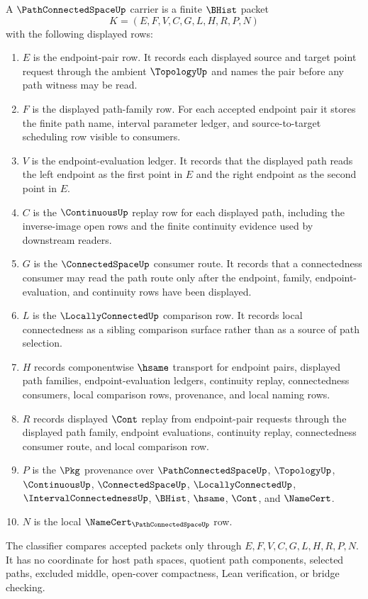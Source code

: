 \begin{definition}
\label{def:path-connected-space-carrier}
A $\PathConnectedSpaceUp$ carrier is a finite $\BHist$ packet
$$
K=(E,F,V,C,G,L,H,R,P,N)
$$
with the following displayed rows:
\begin{enumerate}
\item $E$ is the endpoint-pair row. It records each displayed source and target point request through the ambient $\TopologyUp$ and names the pair before any path witness may be read.
\item $F$ is the displayed path-family row. For each accepted endpoint pair it stores the finite path name, interval parameter ledger, and source-to-target scheduling row visible to consumers.
\item $V$ is the endpoint-evaluation ledger. It records that the displayed path reads the left endpoint as the first point in $E$ and the right endpoint as the second point in $E$.
\item $C$ is the $\ContinuousUp$ replay row for each displayed path, including the inverse-image open rows and the finite continuity evidence used by downstream readers.
\item $G$ is the $\ConnectedSpaceUp$ consumer route. It records that a connectedness consumer may read the path route only after the endpoint, family, endpoint-evaluation, and continuity rows have been displayed.
\item $L$ is the $\LocallyConnectedUp$ comparison row. It records local connectedness as a sibling comparison surface rather than as a source of path selection.
\item $H$ records componentwise $\hsame$ transport for endpoint pairs, displayed path families, endpoint-evaluation ledgers, continuity replay, connectedness consumers, local comparison rows, provenance, and local naming rows.
\item $R$ records displayed $\Cont$ replay from endpoint-pair requests through the displayed path family, endpoint evaluations, continuity replay, connectedness consumer route, and local comparison row.
\item $P$ is the $\Pkg$ provenance over $\PathConnectedSpaceUp$, $\TopologyUp$, $\ContinuousUp$, $\ConnectedSpaceUp$, $\LocallyConnectedUp$, $\IntervalConnectednessUp$, $\BHist$, $\hsame$, $\Cont$, and $\NameCert$.
\item $N$ is the local $\NameCert_{\PathConnectedSpaceUp}$ row.
\end{enumerate}
The classifier compares accepted packets only through $E,F,V,C,G,L,H,R,P,N$. It has no coordinate for host path spaces, quotient path components, selected paths, excluded middle, open-cover compactness, Lean verification, or bridge checking.
\end{definition}

